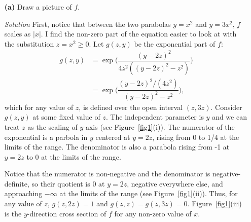 \documentclass[11pt]{article}
\begin{document}
\begin{itemize}
\item[\textbf{(a)}] Draw a picture of $f$.
\item[\emph{Solution}] First, notice that between the two parabolas $y = x^2$ and
  $y = 3x^2$, $f$ scales as $|x|$.  I find the non-zero part of the equation easier
  to look at with the substitution $z = x^2 \ge 0$.  Let $g(z,y)$ be the
  exponential part of $f$:
  \begin{align}
    g(z,y) &= \exp \bigg( \dfrac{(y - 2z)^2}{4z^2((y - 2z)^2 - z^2)}\bigg) \\ &=
    \exp \bigg( \dfrac{(y - 2z)^2/(4z^2)}{(y - 2z)^2 - z^2}\bigg) \label{Eqn_g},
  \end{align}
  which for any value of $z$, is defined over the open interval $(z,3z)$.  Consider
  $g(z,y)$ at some fixed value of $z$.  The independent parameter is $y$ and we can
  treat $z$ as the scaling of $y$-axis (see Figure~\ref{fig1}(i)).  The numerator of
  the exponential is a parbola in $y$ centered at $y=2z$, rising from 0 to 1/4 at
  the limits of the range.  The denominator is also a parabola rising from -1 at
  $y=2z$ to 0 at the limits of the range.

  Notice that the numerator is non-negative and the denominator is
  negative-definite, so their quotient is 0 at $y=2z$, negative everywhere else,
  and approaching $-\infty$ at the limits of the range (see Figure~\ref{fig1}(ii)).
  Thus, for any value of $z$, $g(z,2z) = 1$ and $g(z,z) = g(z,3z) =
  0$. Figure~\ref{fig1}(iii) is the $y$-direction cross section of $f$ for any non-zero
  value of $x$.


\end{itemize}
\end{document}
